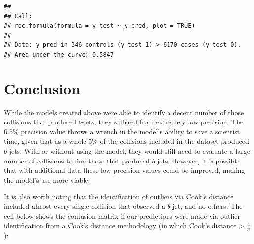 \documentclass[
]{article}
\newenvironment{Shaded}{\begin{snugshade}}{\end{snugshade}}
\newcommand{\AttributeTok}[1]{\textcolor[rgb]{0.77,0.63,0.00}{#1}}
\newcommand{\DecValTok}[1]{\textcolor[rgb]{0.00,0.00,0.81}{#1}}
\newcommand{\FunctionTok}[1]{\textcolor[rgb]{0.00,0.00,0.00}{#1}}
\newcommand{\NormalTok}[1]{#1}
\newcommand{\OtherTok}[1]{\textcolor[rgb]{0.56,0.35,0.01}{#1}}
\newcommand{\SpecialCharTok}[1]{\textcolor[rgb]{0.00,0.00,0.00}{#1}}
\begin{document}
\begin{verbatim}
## 
## Call:
## roc.formula(formula = y_test ~ y_pred, plot = TRUE)
## 
## Data: y_pred in 346 controls (y_test 1) > 6170 cases (y_test 0).
## Area under the curve: 0.5847
\end{verbatim}

\hypertarget{conclusion}{%
\section{Conclusion}\label{conclusion}}

While the models created above were able to identify a decent number of
those collisions that produced \(b\)-jets, they suffered from extremely
low precision. The 6.5\% precision value throws a wrench in the model's
ability to save a scientist time, given that as a whole 5\% of the
collisions included in the dataset produced \(b\)-jets. With or without
using the model, they would still need to evaluate a large number of
collisions to find those that produced \(b\)-jets. However, it is
possible that with additional data these low precision values could be
improved, making the model's use more viable.

It is also worth noting that the identification of outliers via Cook's
distance included almost every single collision that observed a
\(b\)-jet, and no others. The cell below shows the confusion matrix if
our predictions were made via outlier identification from a Cook's
distance methodology (in which Cook's distance \textgreater{}
\(\frac{4}{n}\)):

\begin{Shaded}
\end{Shaded}
\end{document}
